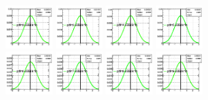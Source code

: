 \begin{figure}[!htbp]
{{\includegraphics[width=0.16\textwidth]{fig/posteriors__pdf42_BB18_fitBBBE161718_ADDGRW.png}
\includegraphics[width=0.16\textwidth]{fig/posteriors__pdf43_BB18_fitBBBE161718_ADDGRW.png}
\includegraphics[width=0.16\textwidth]{fig/posteriors__pdf44_BB18_fitBBBE161718_ADDGRW.png}
\includegraphics[width=0.16\textwidth]{fig/posteriors__pdf45_BB18_fitBBBE161718_ADDGRW.png}\\
\includegraphics[width=0.16\textwidth]{fig/posteriors__pdf46_BB18_fitBBBE161718_ADDGRW.png}
\includegraphics[width=0.16\textwidth]{fig/posteriors__pdf47_BB18_fitBBBE161718_ADDGRW.png}
\includegraphics[width=0.16\textwidth]{fig/posteriors__pdf48_BB18_fitBBBE161718_ADDGRW.png}
\includegraphics[width=0.16\textwidth]{fig/posteriors__pdf49_BB18_fitBBBE161718_ADDGRW.png}
}}
\end{figure}
